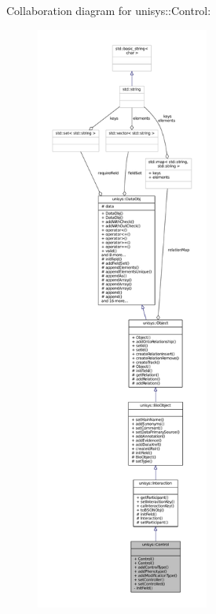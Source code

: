 Collaboration diagram for unisys\-:\-:Control\-:
\nopagebreak
\begin{figure}[H]
\begin{center}
\leavevmode
\includegraphics[height=550pt]{classunisys_1_1Control__coll__graph}
\end{center}
\end{figure}
